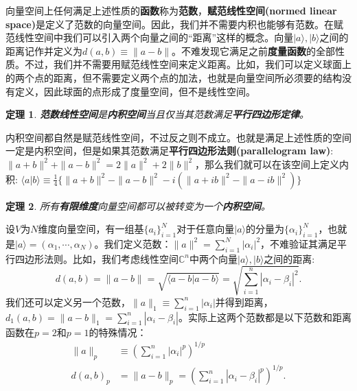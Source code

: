 \documentclass[mathserif,hyperref,UTF8,openany,b5paper]{ctexbook}
\newtheorem{thm}{定理}[section]
\begin{document}
向量空间上任何满足上述性质的\textbf{函数}称为\textbf{范数}，\textbf{赋范线性空间(normed linear space)}是定义了范数的向量空间。因此，我们并不需要内积也能够有范数。在赋范线性空间中我们可以引入两个向量之间的“距离”这样的概念。向量$|a\rangle,|b\rangle$之间的距离记作并定义为$d(a,b)\equiv\|a-b\|$。不难发现它满足之前\textbf{度量函数}的全部性质。不过，我们并不需要用赋范线性空间来定义距离。比如，我们可以定义球面上的两个点的距离，但不需要定义两个点的加法，也就是向量空间所必须要的结构没有定义，因此球面的点形成了度量空间，但不是线性空间。
\begin{thm}
\textbf{范数线性空间}是\textbf{内积空间}当且仅当其范数满足\textbf{平行四边形定律}。
\end{thm}

内积空间都自然是赋范线性空间，不过反之则不成立。也就是满足上述性质的空间一定是内积空间，但是如果其范数满足\textbf{平行四边形法则(parallelogram law)}:$\|a+b\|^2+\|a-b\|^2=2\|a\|^2+2\|b\|^2$，那么我们就可以在该空间上定义内积: $\langle a|b\rangle \equiv \frac{1}{4}\{\|a+b\|^2-\|a-b\|^2 - i(\|a+ib\|^2-\|a-ib\|^2)\}$

\begin{thm}
所有\textbf{有限维度}向量空间都可以被转变为一个\textbf{内积空间}。
\end{thm}

设$V$为$N$维度向量空间，有一组基$\{a_i\}^N_{i=1}$对于任意向量$|a\rangle$的分量为$\{\alpha_i\}^N_{i=1}$，也就是$|a\rangle = (\alpha_1,\cdots,\alpha_N)$。我们定义范数：$\|a\|^2=\sum^N_{i=1}|\alpha_i|^2$，不难验证其满足平行四边形法则。比如，我们考虑线性空间$\mathbb{C}^n$中两个向量$|a\rangle,|b\rangle$之间的距离:
\begin{equation}
    d(a,b)=\|a-b\|=\sqrt{\langle a-b|a-b\rangle}=\sqrt{\sum^n_{i=1}|\alpha_i-\beta_i|^2}.
\end{equation}
我们还可以定义另一个范数，$\|a\|_1 \equiv \sum_{i=1}^n|\alpha_i|$并得到距离，$d_1(a,b)=\|a-b\|_1=\sum_{i=1}^n|\alpha_i-\beta_i|$。实际上这两个范数都是以下范数和距离函数在$p=2$和$p=1$的特殊情况：
\begin{align}
    \|a\|_p &\equiv \left(\sum_{i=1}^n|\alpha_i|^p\right)^{1/p}\\
    d(a,b)_p &=\|a-b\|_p=\left(\sum^n_{i=1}|\alpha_i-\beta_i|^p\right)^{1/p}.
\end{align}
\end{document}
